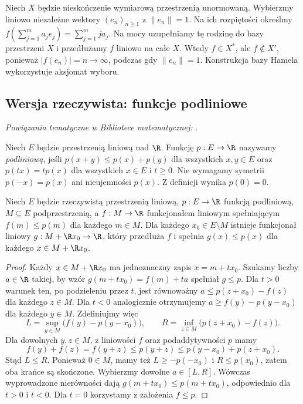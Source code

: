 \begin{przyklad}
\label{ex:discontinuous-functional}
Niech $X$ będzie nieskończenie wymiarową przestrzenią
unormowaną. Wybierzmy liniowo niezależne wektory $(e_n)_{n\ge1}$
z $\|e_n\|=1$. Na ich rozpiętości określmy
$f(\sum_{j=1}^m a_je_j)=\sum_{j=1}^m j a_j$.
Na mocy 
uzupełniamy tę rodzinę do bazy przestrzeni $X$ i przedłużamy $f$ liniowo na całe $X$. Wtedy $f\in X^*$,
ale $f\notin X'$, ponieważ $|f(e_n)|=n\to\infty$,
podczas gdy $\|e_n\|=1$. Konstrukcja bazy Hamela
wykorzystuje aksjomat wyboru.
\end{przyklad}

\subsection{Wersja rzeczywista: funkcje podliniowe}

\noindent\emph{Powiązania tematyczne w Bibliotece matematycznej:} .


\begin{definicja}\label{def:sublinear}
Niech $E$ będzie przestrzenią liniową nad $\R$.
Funkcję $p:E\to\R$ nazywamy \emph{podliniową}, jeśli
$p(x+y)\le p(x)+p(y)$ dla wszystkich $x,y\in E$ oraz
$p(tx)=tp(x)$ dla wszystkich $x\in E$ i $t\ge0$.
Nie wymagamy symetrii $p(-x)=p(x)$ ani nieujemności $p(x)$.
Z definicji wynika $p(0)=0$.
\end{definicja}

\begin{lemat}
\label{lem:hb-one-step}
Niech $E$ będzie rzeczywistą przestrzenią liniową,
$p:E\to\R$ funkcją podliniową, $M\subseteq E$ podprzestrzenią,
a $f:M\to\R$ funkcjonałem liniowym spełniającym
$f(m)\le p(m)$ dla każdego $m\in M$. Dla każdego
$x_0\in E\setminus M$ istnieje funkcjonał liniowy
$g:M+\R x_0\to\R$, który przedłuża $f$ i spełnia
$g(x)\le p(x)$ dla każdego $x\in M+\R x_0$.
\end{lemat}
\begin{proof}
Każdy $x\in M+\R x_0$ ma jednoznaczny zapis $x=m+tx_0$.
Szukamy liczby $a\in\R$ takiej, by wzór
$g(m+tx_0)=f(m)+ta$ spełniał $g\le p$.
Dla $t>0$ warunek ten, po podzieleniu przez $t$,
jest równoważny $a\le p(z+x_0)-f(z)$ dla każdego $z\in M$.
Dla $t<0$ analogicznie otrzymujemy
$a\ge f(y)-p(y-x_0)$ dla każdego $y\in M$.
Zdefiniujmy więc
\[
 L=\sup_{y\in M}\bigl(f(y)-p(y-x_0)\bigr),\qquad
 R=\inf_{z\in M}\bigl(p(z+x_0)-f(z)\bigr).
\]
Dla dowolnych $y,z\in M$, z liniowości $f$ oraz
podaddytywności $p$ mamy
\[
 f(y)+f(z)=f(y+z)\le p(y+z)
 \le p(y-x_0)+p(z+x_0).
\]
Stąd $L\le R$. Ponieważ $0\in M$, mamy też
$L\ge-p(-x_0)$ i $R\le p(x_0)$, zatem oba krańce
są skończone. Wybierzmy dowolne $a\in[L,R]$.
Wówczas wyprowadzone nierówności dają $g(m+tx_0)\le
p(m+tx_0)$, odpowiednio dla $t>0$ i $t<0$.
Dla $t=0$ korzystamy z założenia $f\le p$.
\end{proof}

